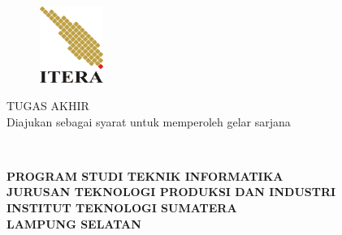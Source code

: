 \clearpage
\pagestyle{empty}
% 

\begin{center}
\smallskip

    \begin{figure}[h]
    	\centering
    	\includegraphics[width=2.1cm, height=2.5cm, keepaspectratio]{resources/itera-logo}
    \end{figure}

	\large \bfseries \MakeUppercase{\thetitle}
	\vfill

    \large \uppercase{Tugas Akhir}\\
    {\normalsize \normalfont Diajukan sebagai syarat untuk memperoleh gelar sarjana}
    \vfill

    \normalsize \normalfont \theauthor\\
    \printnim
    \vfill

    \normalsize \bfseries
    \uppercase{
        Program Studi Teknik Informatika \\
        Jurusan Teknologi Produksi dan Industri\\
        Institut Teknologi Sumatera\\
        Lampung Selatan
    }\medskip

    \thedate

\end{center}

\clearpage
